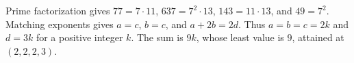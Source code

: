 Prime factorization gives $77=7\cdot11$, $637=7^2\cdot13$, $143=11\cdot13$, and $49=7^2$. Matching exponents gives $a=c$, $b=c$, and $a+2b=2d$. Thus $a=b=c=2k$ and $d=3k$ for a positive integer $k$. The sum is $9k$, whose least value is $\boxed9$, attained at $(2,2,2,3)$.
